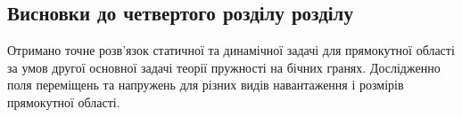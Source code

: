 \subsection{Висновки до четвертого розділу розділу}
Отримано точне розв'язок статичної та динамічної задачі для прямокутної області за умов другої основної задачі теорії пружності на бічних гранях.
Дослідженно поля переміщень та напружень для різних видів навантаження і розмірів прямокутної області.